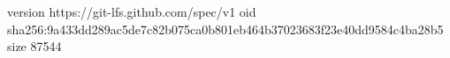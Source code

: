 version https://git-lfs.github.com/spec/v1
oid sha256:9a433dd289ac5de7c82b075ca0b801eb464b37023683f23e40dd9584c4ba28b5
size 87544
